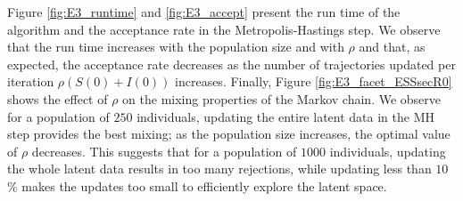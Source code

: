 \documentclass[11pt]{article}
\begin{document}
	Figure \ref{fig:E3_runtime} and \ref{fig:E3_accept} present the run time of the algorithm and the acceptance rate in the Metropolis-Hastings step. We observe that the run time increases with the population size and with $\rho$ and that, as expected, the acceptance rate decreases as the number of trajectories updated per iteration $\rho(S(0)+I(0))$ increases.
	Finally, Figure \ref{fig:E3_facet_ESSsecR0} shows the effect of $\rho$ on the mixing properties of the Markov chain. We observe for a population of $250$ individuals, updating the entire latent data in the MH step provides the best mixing; as the population size increases, the optimal value of $\rho$ decreases. This suggests that for a population of $1000$ individuals, updating the whole latent data results in too many rejections, while updating less than $10$\% makes the updates too small to efficiently explore the latent space.
	
\end{document}
